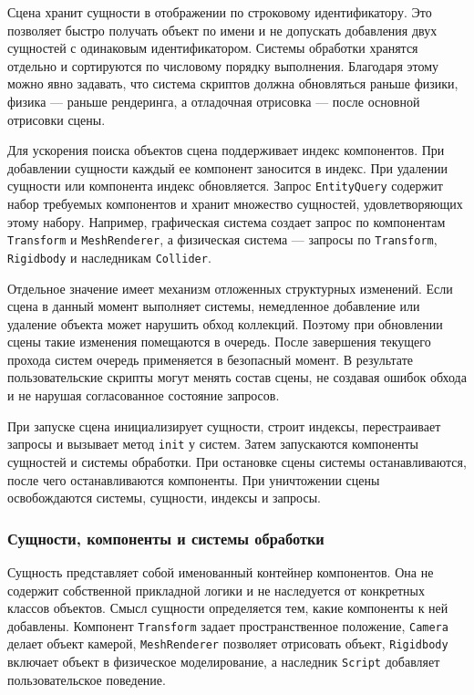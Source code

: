 Сцена хранит сущности в отображении по строковому идентификатору. Это
позволяет быстро получать объект по имени и не допускать добавления двух
сущностей с одинаковым идентификатором. Системы обработки хранятся отдельно
и сортируются по числовому порядку выполнения. Благодаря этому можно явно
задавать, что система скриптов должна обновляться раньше физики, физика —
раньше рендеринга, а отладочная отрисовка — после основной отрисовки сцены.

Для ускорения поиска объектов сцена поддерживает индекс компонентов. При
добавлении сущности каждый ее компонент заносится в индекс. При удалении
сущности или компонента индекс обновляется. Запрос \texttt{EntityQuery} содержит
набор требуемых компонентов и хранит множество сущностей, удовлетворяющих
этому набору. Например, графическая система создает запрос по компонентам
\texttt{Transform} и \texttt{MeshRenderer}, а физическая система — запросы по
\texttt{Transform}, \texttt{Rigidbody} и наследникам \texttt{Collider}.

Отдельное значение имеет механизм отложенных структурных изменений. Если
сцена в данный момент выполняет системы, немедленное добавление или удаление
объекта может нарушить обход коллекций. Поэтому при обновлении сцены такие
изменения помещаются в очередь. После завершения текущего прохода систем
очередь применяется в безопасный момент. В результате пользовательские скрипты
могут менять состав сцены, не создавая ошибок обхода и не нарушая согласованное
состояние запросов.

При запуске сцена инициализирует сущности, строит индексы, перестраивает
запросы и вызывает метод \texttt{init} у систем. Затем запускаются компоненты
сущностей и системы обработки. При остановке сцены системы останавливаются,
после чего останавливаются компоненты. При уничтожении сцены освобождаются
системы, сущности, индексы и запросы.

\subsubsection{Сущности, компоненты и системы обработки}

Сущность представляет собой именованный контейнер компонентов. Она не содержит
собственной прикладной логики и не наследуется от конкретных классов объектов.
Смысл сущности определяется тем, какие компоненты к ней добавлены. Компонент
\texttt{Transform} задает пространственное положение, \texttt{Camera} делает
объект камерой, \texttt{MeshRenderer} позволяет отрисовать объект,
\texttt{Rigidbody} включает объект в физическое моделирование, а наследник
\texttt{Script} добавляет пользовательское поведение.

